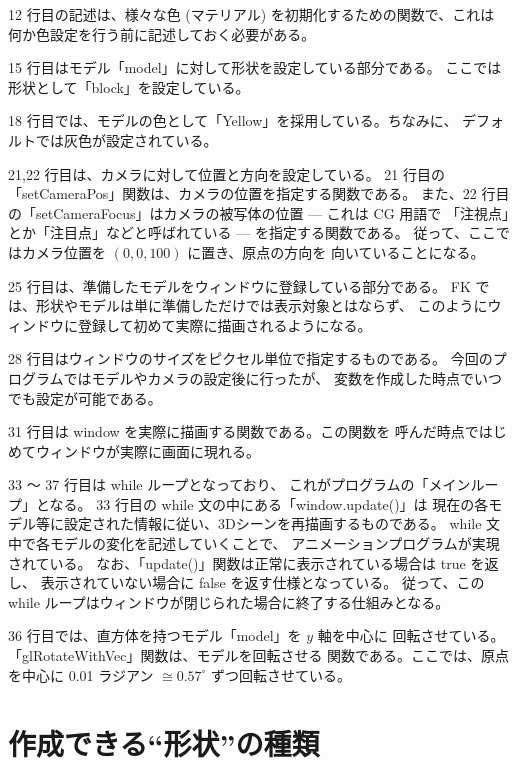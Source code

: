 12 行目の記述は、様々な色 (マテリアル) を初期化するための関数で、これは
何か色設定を行う前に記述しておく必要がある。

15 行目はモデル「model」に対して形状を設定している部分である。
ここでは形状として「block」を設定している。

18 行目では、モデルの色として「Yellow」を採用している。ちなみに、
デフォルトでは灰色が設定されている。

21,22 行目は、カメラに対して位置と方向を設定している。
21 行目の「setCameraPos」関数は、カメラの位置を指定する関数である。
また、22 行目の「setCameraFocus」はカメラの被写体の位置 --- これは CG 用語で
「注視点」とか「注目点」などと呼ばれている --- を指定する関数である。
従って、ここではカメラ位置を \((0, 0, 100)\) に置き、原点の方向を
向いていることになる。

25 行目は、準備したモデルをウィンドウに登録している部分である。
FK では、形状やモデルは単に準備しただけでは表示対象とはならず、
このようにウィンドウに登録して初めて実際に描画されるようになる。

28 行目はウィンドウのサイズをピクセル単位で指定するものである。
今回のプログラムではモデルやカメラの設定後に行ったが、
変数を作成した時点でいつでも設定が可能である。

31 行目は window を実際に描画する関数である。この関数を
呼んだ時点ではじめてウィンドウが実際に画面に現れる。

33 〜 37 行目は while ループとなっており、
これがプログラムの「メインループ」となる。
33 行目の while 文の中にある「window.update()」は
現在の各モデル等に設定された情報に従い、3Dシーンを再描画するものである。
while 文中で各モデルの変化を記述していくことで、
アニメーションプログラムが実現されている。
なお、「update()」関数は正常に表示されている場合は true を返し、
表示されていない場合に false を返す仕様となっている。
従って、この while ループはウィンドウが閉じられた場合に終了する仕組みとなる。

36 行目では、直方体を持つモデル「model」を \(y\) 軸を中心に
回転させている。「glRotateWithVec」関数は、モデルを回転させる
関数である。ここでは、原点を中心に 0.01 ラジアン \(\cong 0.57^\circ\)
ずつ回転させている。

\section{作成できる``形状''の種類}

